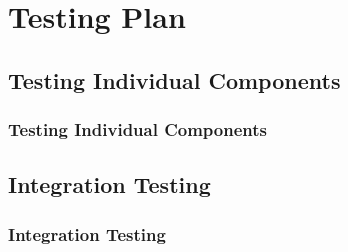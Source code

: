 \section{Testing Plan}

\subsection{Testing Individual Components}
\begin{frame}
\frametitle{Testing Individual Components}


\end{frame}

\subsection{Integration Testing}
\begin{frame}
\frametitle{Integration Testing}


\end{frame}
